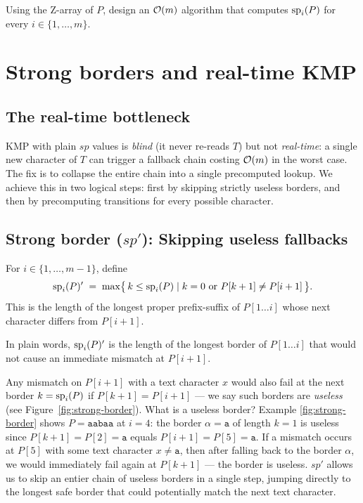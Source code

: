 \begin{exercise}
  Using the Z-array of $P$, design an $\mathcal{O}\!\left(m\right)$ algorithm that computes $\mathrm{sp}_{i}(P)$ for every
  $i \in \{1, \ldots, m\}$.
\end{exercise}

\section{Strong borders and real-time KMP}

\subsection{The real-time bottleneck}

KMP with plain $sp$ values is \emph{blind} (it never re-reads $T$) but not \emph{real-time}:
a single new character of $T$ can trigger a fallback chain costing $\mathcal{O}\!\left(m\right)$ in the worst
case. 
The fix is to collapse the entire chain into a single precomputed lookup. We achieve this 
in two logical steps: first by skipping strictly useless borders, and then by precomputing 
transitions for every possible character.

\subsection{Strong border ($sp'$): Skipping useless fallbacks}

\begin{definition}
  For $i \in \{1,\ldots,m-1\}$, define
  \[
    \mathrm{sp}_{i}(P)' \;=\; \max\bigl\{\, k \leq \mathrm{sp}_{i}(P) \mid k = 0 \text{ or }
    P[k+1] \neq P[i+1] \,\bigr\}.
  \]
  This is the length of the longest proper prefix-suffix of $P[1\ldots i]$ whose next
  character differs from $P[i+1]$.
\end{definition}

In plain words, $\mathrm{sp}_{i}(P)'$ is the length of the longest border of $P[1\ldots i]$ that would
not cause an immediate mismatch at $P[i+1]$. 

Any mismatch on $P[i+1]$ with a text character $x$ would also fail at the next
border $k = \mathrm{sp}_{i}(P)$ if $P[k+1] = P[i+1]$ --- we say such borders are \emph{useless}
(see Figure~\ref{fig:strong-border}). What is a useless border? Example \ref{fig:strong-border} shows $P = \texttt{aabaa}$ at $i=4$: the border $\alpha = \texttt{a}$ of length $k=1$ is useless since $P[k+1] = P[2] = \texttt{a}$ equals $P[i+1] = P[5] = \texttt{a}$.
If a mismatch occurs at $P[5]$ with some text character $x \neq \texttt{a}$, then after falling back to the border $\alpha$, we would immediately fail again at $P[k+1]$ --- the border is useless.
$sp'$ allows us to skip an entier chain of useless borders in a single step, jumping directly to the longest safe border that could potentially match the next text character.


